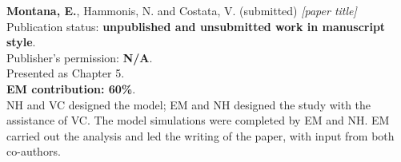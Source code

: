 \vspace{1.25em}

\noindent
\textbf{Montana, E.}, Hammonis, N. and Costata, V. (submitted) \textit{[paper title]}\\
Publication status: \textbf{unpublished and unsubmitted work in manuscript style}.\\
Publisher's permission: \textbf{N/A}.\\
Presented as Chapter 5.\\
\textbf{EM contribution: 60\%}.\\
NH and VC designed the model; EM and NH designed the study with the assistance of VC. The model simulations were completed by EM and NH. EM carried out the analysis and led the writing of the paper, with input from both co-authors.